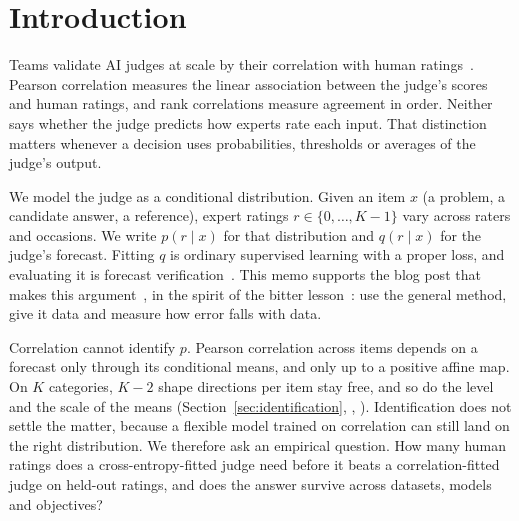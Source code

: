\section{Introduction}
\label{sec:intro}

Teams validate AI judges at scale by their correlation with human ratings~\citep{liu2023geval,zheng2023judging}.
Pearson correlation measures the linear association between the judge's scores and human ratings, and rank correlations measure agreement in order.
Neither says whether the judge predicts how experts rate each input.
That distinction matters whenever a decision uses probabilities, thresholds or averages of the judge's output.

We model the judge as a conditional distribution.
Given an item $x$ (a problem, a candidate answer, a reference), expert ratings $r\in\{0,\dots,K-1\}$ vary across raters and occasions.
We write $p(r\mid x)$ for that distribution and $q(r\mid x)$ for the judge's forecast.
Fitting $q$ is ordinary supervised learning with a proper loss, and evaluating it is forecast verification~\citep{gneiting2007strictly}.
This memo supports the blog post that makes this argument~\citep{miranda2026bitter}, in the spirit of the bitter lesson~\citep{sutton2019bitter}: use the general method, give it data and measure how error falls with data.

Correlation cannot identify $p$.
Pearson correlation across items depends on a forecast only through its conditional means, and only up to a positive affine map.
On $K$ categories, $K-2$ shape directions per item stay free, and so do the level and the scale of the means (Section~\ref{sec:identification}, , ).
Identification does not settle the matter, because a flexible model trained on correlation can still land on the right distribution.
We therefore ask an empirical question.
How many human ratings does a cross-entropy-fitted judge need before it beats a correlation-fitted judge on held-out ratings, and does the answer survive across datasets, models and objectives?

